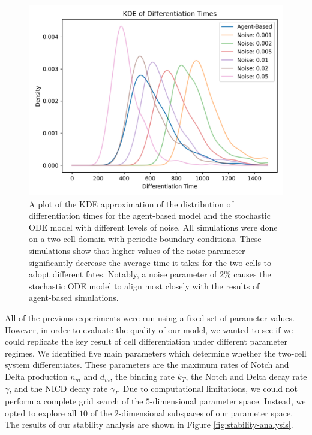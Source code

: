 \documentclass{article}
\begin{document}
\begin{figure}[!htp]
  \includegraphics[width=\textwidth]{img/vis11_V2.png}
  \caption{A plot of the KDE approximation of the distribution of differentiation times for the agent-based model and the stochastic ODE model with different levels of noise. All simulations were done on a two-cell domain with periodic boundary conditions. These simulations show that higher values of the noise parameter significantly decrease the average time it takes for the two cells to adopt different fates. Notably, a noise parameter of $2\%$ causes the stochastic ODE model to align most closely with the results of agent-based simulations. }
  \label{fig:noise-estimate}
\end{figure}

All of the previous experiments were run using a fixed set of parameter values.
However, in order to evaluate the quality of our model, we wanted to see if we could replicate the key result of cell differentiation under different parameter regimes.
We identified five main parameters which determine whether the two-cell system differentiates.
These parameters are the maximum rates of Notch and Delta production $n_{m}$ and $d_{m}$, the binding rate $k_{T}$, the Notch and Delta decay rate $\gamma$, and the NICD decay rate $\gamma_{I}$.
Due to computational limitations, we could not perform a complete grid search of the $5$-dimensional parameter space.
Instead, we opted to explore all $10$ of the $2$-dimensional subspaces of our parameter space.
The results of our stability analysis are shown in Figure \ref{fig:stability-analysis}.
\end{document}
